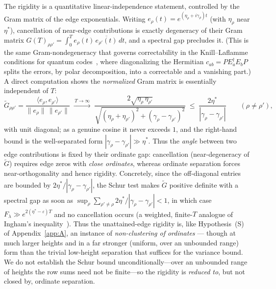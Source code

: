 \begin{remark}\label{rmk:gram}
The rigidity is a quantitative linear-independence statement, controlled by the
Gram matrix of the edge exponentials.  Writing
$e_\rho(t)=e^{(\eta_\rho+i\gamma_\rho)t}$ (with $\eta_\rho$ near $\eta^\ast$),
cancellation of near-edge contributions is exactly degeneracy of their Gram
matrix $G(T)_{\rho\rho'}=\int_0^T e_\rho(t)\,\overline{e_{\rho'}(t)}\,dt$, and a
spectral gap precludes it.  (This is the same Gram-nondegeneracy that governs
correctability in the Knill--Laflamme conditions for quantum
codes~\cite{knill-laflamme}, where diagonalizing the Hermitian
$c_{ab}=PE_a^\dagger E_bP$ splits the errors, by polar decomposition, into a
correctable and a vanishing part.)  A direct
computation shows the \emph{normalized} Gram matrix is essentially independent
of $T$:
\begin{equation}
\widetilde G_{\rho\rho'}
=\frac{\langle e_\rho,e_{\rho'}\rangle}{\|e_\rho\|\,\|e_{\rho'}\|}
\;\xrightarrow{\,T\to\infty\,}\;
\frac{2\sqrt{\eta_\rho\,\eta_{\rho'}}}{\sqrt{(\eta_\rho+\eta_{\rho'})^2+(\gamma_\rho-\gamma_{\rho'})^2}}
\;\le\;\frac{2\eta^\ast}{|\gamma_\rho-\gamma_{\rho'}|}
\qquad(\rho\ne\rho'),
\label{eq:gram-cos}
\end{equation}
with unit diagonal; as a genuine cosine it never exceeds $1$, and the right-hand
bound is the well-separated form $|\gamma_\rho-\gamma_{\rho'}|\gg\eta^\ast$.  Thus
the \emph{angle} between two edge contributions is fixed by their ordinate gap:
cancellation (near-degeneracy of $\widetilde G$) requires edge zeros with
\emph{close ordinates}, whereas ordinate separation forces near-orthogonality and
hence rigidity.  Concretely, since the off-diagonal entries are bounded by
$2\eta^\ast/|\gamma_\rho-\gamma_{\rho'}|$, the Schur test makes $\widetilde G$
positive definite with a spectral gap as soon as
$\sup_\rho\sum_{\rho'\ne\rho}2\eta^\ast/|\gamma_\rho-\gamma_{\rho'}|<1$, in which
case $F_\lambda\gg e^{2(\eta^\ast-\varepsilon)T}$ and no cancellation occurs (a
weighted, finite-$T$ analogue of Ingham's inequality~\cite{ingham-ineq}).  Thus
the unattained-edge rigidity is, like Hypothesis~(S) of Appendix~\ref{app:A}, an
instance of \emph{non-clustering of ordinates} --- though at much larger heights
and in a far stronger (uniform, over an unbounded range) form than the trivial
low-height separation that suffices for the variance bound.  We do not establish
the Schur bound
unconditionally---over an unbounded range of heights the row sums need not be
finite---so the rigidity is \emph{reduced to}, but not closed by, ordinate
separation.
\end{remark}

